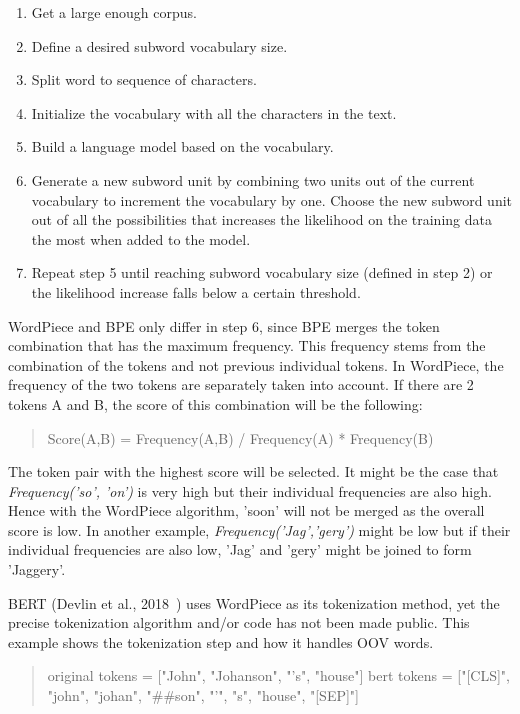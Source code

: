 \begin{enumerate}
    \item Get a large enough corpus.
    \item Define a desired subword vocabulary size.
    \item Split word to sequence of characters.
    \item Initialize the vocabulary with all the characters in the text.
    \item Build a language model based on the vocabulary.
    \item Generate a new subword unit by combining two units out of the current vocabulary to increment the vocabulary by one. Choose the new subword unit out of all the possibilities that increases the likelihood on the training data the most when added to the model.
    \item Repeat step 5 until reaching subword vocabulary size (defined in step 2) or the likelihood increase falls below a certain threshold.
\end{enumerate}

WordPiece and BPE only differ in step 6, since BPE merges the token combination that has the maximum frequency. This frequency stems from the combination of the tokens and not previous individual tokens. In WordPiece, the frequency of the two tokens are separately taken into account. If there are 2 tokens A and B, the score of this combination will be the following:

\begin{quote}
    Score(A,B) = Frequency(A,B) / Frequency(A) * Frequency(B)
\end{quote}

The token pair with the highest score will be selected. It might be the case that \textit{Frequency('so', 'on')} is very high but their individual frequencies are also high. Hence with the WordPiece algorithm, 'soon' will not be merged as the overall score is low. In another example, \textit{Frequency('Jag','gery')} might be low but if their individual frequencies are also low, 'Jag' and 'gery' might be joined to form 'Jaggery'.

BERT (Devlin et al., 2018~\cite{devlin2018bert}) uses WordPiece as its tokenization method, yet the precise tokenization algorithm and/or code has not been made public. This example shows the tokenization step and how it handles OOV words.

\begin{quote}
    original tokens = ["John", "Johanson", "'s",  "house"]
    bert tokens = ["[CLS]", "john", "johan", "\#\#son", "'", "s", "house", "[SEP]"]
\end{quote}

